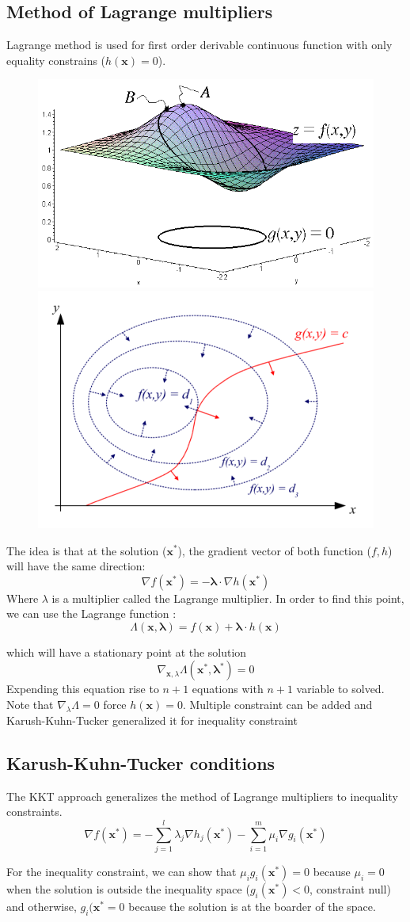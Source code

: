 \documentclass[twocolumn]{article}
\numberwithin{equation}{section}
\begin{document}
	\subsection{Method of Lagrange multipliers}
Lagrange method is used for first order derivable continuous function with only equality constrains ($h(\mathbf{x})=0$).

\begin{figure}[H]
	\centering
    \includegraphics[width=.20\textwidth]{lagrange.png}
    \includegraphics[width=.20\textwidth]{LagrangeMultipliers2D.png}
\end{figure}
 The idea is that at the solution ($\mathbf{x^*}$), the gradient vector of both function ($f,h$) will have the same direction: 
 $$\nabla f(\mathbf{x^*}) = -\mathbf{\lambda} \cdot \nabla h(\mathbf{x^*})$$
Where $\lambda$ is a multiplier called the Lagrange multiplier. In order to find this point, we can use the Lagrange function :
$$ \Lambda(\mathbf{x},\mathbf{\lambda}) = f(\mathbf{x}) + \mathbf{\lambda} \cdot h(\mathbf{x})$$

which will have a stationary point at the solution 
$$\nabla_{\mathbf{x},\lambda} \Lambda(\mathbf{x^*},\mathbf{\lambda^*})=0$$
Expending this equation rise to $n+1$ equations with $n+1$ variable to solved. Note that $\nabla_\lambda \Lambda=0$ force $h(\mathbf{x})=0$. Multiple constraint can be added and Karush-Kuhn-Tucker generalized it for inequality constraint





	\subsection{Karush-Kuhn-Tucker conditions}
The KKT approach generalizes the method of Lagrange multipliers to inequality constraints.
 $$\nabla f(\mathbf{x^*}) = - \sum_{j=1}^l \lambda_j \nabla h_j(\mathbf{x^*}) -\sum_{i=1}^m \mu_i \nabla g_i(\mathbf{x^*})$$

For the inequality constraint, we can show that $\mu_i g_i (\mathbf{x^*}) = 0$ because $\mu_i=0$ when the solution is outside the inequality space ($g_i(\mathbf{x^*}) < 0$, constraint null) and otherwise, $g_i (\mathbf{x^*}=0$ because the solution is at the boarder of the space.
\end{document}
